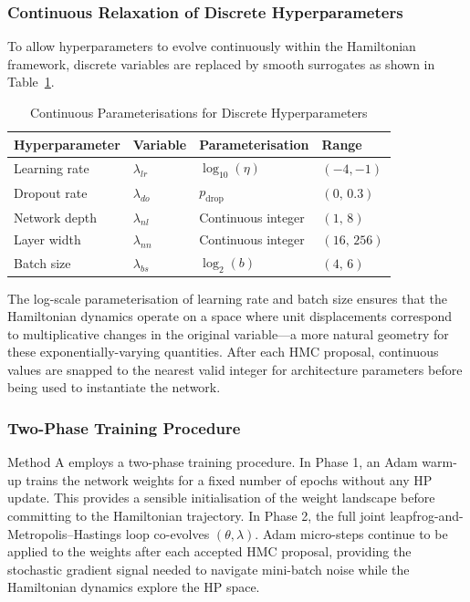 \documentclass[12pt,a4paper]{article}
\begin{document}
\subsubsection{Continuous Relaxation of Discrete Hyperparameters}

To allow hyperparameters to evolve continuously within the Hamiltonian
framework, discrete variables are replaced by smooth surrogates as
shown in Table~\ref{tab:hpparam}.

\begin{table}[tb]
\centering
\caption{Continuous Parameterisations for Discrete Hyperparameters}
\label{tab:hpparam}
\renewcommand{\arraystretch}{1.2}
\begin{tabular}{llll}
\toprule
Hyperparameter & Variable & Parameterisation & Range \\
\midrule
Learning rate  & $\lambda_{lr}$ & $\log_{10}(\eta)$    & $(-4,-1)$ \\
Dropout rate   & $\lambda_{do}$ & $p_{\mathrm{drop}}$  & $(0,\,0.3)$ \\
Network depth  & $\lambda_{nl}$ & Continuous integer   & $(1,\,8)$ \\
Layer width    & $\lambda_{nn}$ & Continuous integer   & $(16,\,256)$ \\
Batch size     & $\lambda_{bs}$ & $\log_2(b)$          & $(4,\,6)$ \\
\bottomrule
\end{tabular}
\end{table}

The log-scale parameterisation of learning rate and batch size ensures
that the Hamiltonian dynamics operate on a space where unit displacements
correspond to multiplicative changes in the original variable—a more
natural geometry for these exponentially-varying quantities.  After
each HMC proposal, continuous values are snapped to the nearest valid
integer for architecture parameters before being used to instantiate
the network.

\subsubsection{Two-Phase Training Procedure}

Method A employs a two-phase training procedure.  In Phase 1, an Adam
warm-up trains the network weights for a fixed number of epochs without
any HP update.  This provides a sensible initialisation of the weight
landscape before committing to the Hamiltonian trajectory.  In Phase 2,
the full joint leapfrog-and-Metropolis--Hastings loop co-evolves
$(\theta, \lambda)$.  Adam micro-steps continue to be applied to the
weights after each accepted HMC proposal, providing the stochastic
gradient signal needed to navigate mini-batch noise while the
Hamiltonian dynamics explore the HP space.
\end{document}
